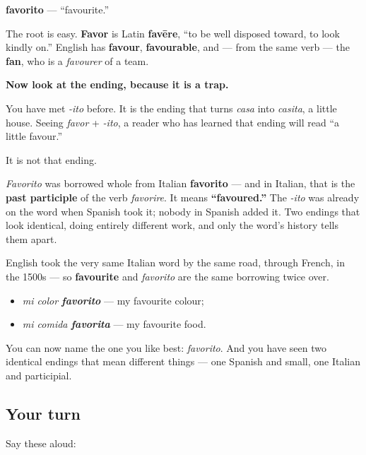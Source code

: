 \begin{cousinweb}
\textbf{favorito} — \textquotedblleft{}favourite.\textquotedblright{}

The root is easy. \textbf{Favor} is Latin \textbf{favēre}, \textquotedblleft{}to be well disposed toward, to look kindly on.\textquotedblright{} English has \textbf{favour}, \textbf{favourable}, and — from the same verb — the \textbf{fan}, who is a \emph{favourer} of a team.

\textbf{Now look at the ending, because it is a trap.}

You have met \emph{-ito} before. It is the ending that turns \emph{casa} into \emph{casita}, a little house. Seeing \emph{favor} + \emph{-ito}, a reader who has learned that ending will read \textquotedblleft{}a little favour.\textquotedblright{}

It is not that ending.

\emph{Favorito} was borrowed whole from Italian \textbf{favorito} — and in Italian, that is the \textbf{past participle} of the verb \emph{favorire}. It means \textbf{\textquotedblleft{}favoured.\textquotedblright{}} The \emph{-ito} was already on the word when Spanish took it; nobody in Spanish added it. Two endings that look identical, doing entirely different work, and only the word's history tells them apart.

English took the very same Italian word by the same road, through French, in the 1500s — so \textbf{favourite} and \emph{favorito} are the same borrowing twice over.

\begin{itemize}
\raggedright
  \item \emph{mi color \textbf{favorito}} — my favourite colour;
  \item \emph{mi comida \textbf{favorita}} — my favourite food.
\end{itemize}
\end{cousinweb}

\begin{grammarlens}[title={What you've built}]
You can now name the one you like best: \emph{favorito}. And you have seen two identical endings that mean different things — one Spanish and small, one Italian and participial.
\end{grammarlens}

\subsection*{Your turn}
Say these aloud:

